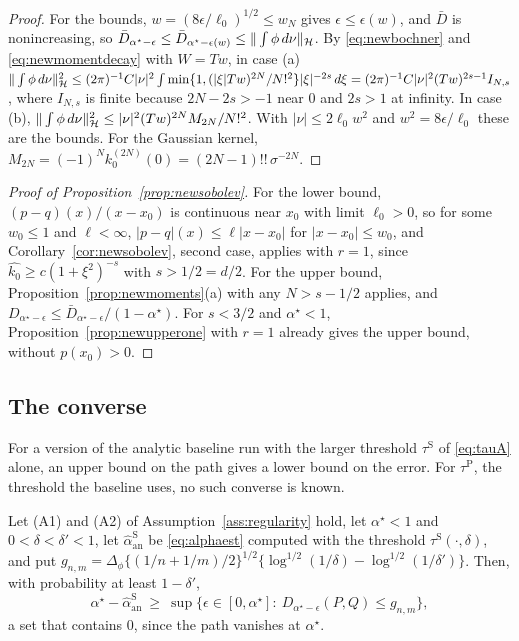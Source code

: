 \begin{proof}
For the bounds, $w=(8\epsilon/\ell_0)^{1/2}\le w_N$ gives $\epsilon\le\epsilon(w)$, and $\bar D$ is nonincreasing, so
$\bar D_{\alpha^\star-\epsilon}\le \bar D_{\alpha^\star-\epsilon(w)}\le\|\int\phi\,d\nu\|_{\mathcal{H}}$. By \eqref{eq:newbochner} and \eqref{eq:newmomentdecay}
with $W=Tw$, in case (a) $\|\int\phi\,d\nu\|_{\mathcal{H}}^2\le(2\pi)^{-1}C|\nu|^2\int\min\{1,(|\xi|Tw)^{2N}/N!^2\}|\xi|^{-2s}\,d\xi
=(2\pi)^{-1}C|\nu|^2(Tw)^{2s-1}I_{N,s}$, where $I_{N,s}$ is finite because $2N-2s>-1$ near $0$ and $2s>1$ at infinity. In case
(b), $\|\int\phi\,d\nu\|_{\mathcal{H}}^2\le|\nu|^2(Tw)^{2N}M_{2N}/N!^2$. With $|\nu|\le2\ell_0w^2$ and $w^2=8\epsilon/\ell_0$ these are the
bounds. For the Gaussian kernel, $M_{2N}=(-1)^Nk_0^{(2N)}(0)=(2N-1)!!\,\sigma^{-2N}$.
\end{proof}

\begin{proof}[Proof of Proposition~\ref{prop:newsobolev}]
For the lower bound, $(p-q)(x)/(x-x_0)$ is continuous near $x_0$ with limit $\ell_0>0$, so for some $w_0\le1$ and $\ell<\infty$,
$|p-q|(x)\le\ell|x-x_0|$ for $|x-x_0|\le w_0$, and Corollary~\ref{cor:newsobolev}, second case, applies with $r=1$, since
$\widehat{k_0}\ge c(1+\xi^2)^{-s}$ with $s>1/2=d/2$. For the upper bound, Proposition~\ref{prop:newmoments}(a) with any
$N>s-1/2$ applies, and $D_{\alpha^\star-\epsilon}\le \bar D_{\alpha^\star-\epsilon}/(1-\alpha^\star)$. For $s<3/2$ and $\alpha^\star<1$,
Proposition~\ref{prop:newupperone} with $r=1$ already gives the upper bound, without $p(x_0)>0$.
\end{proof}

\subsection{The converse}

For a version of the analytic baseline run with the larger threshold $\tau^{\mathrm S}$ of \eqref{eq:tauA} alone, an
upper bound on the path gives a lower bound on the error. For $\tau^{\mathrm P}$, the threshold the baseline uses, no
such converse is known.

\begin{proposition}
\label{prop:newconverse}
Let (A1) and (A2) of Assumption~\ref{ass:regularity} hold, let $\alpha^\star<1$ and $0<\delta<\delta'<1$, let
$\widehat\alpha_{\mathrm{an}}^{\mathrm S}$ be \eqref{eq:alphaest} computed with the threshold $\tau^{\mathrm S}(\cdot,\delta)$, and put
$g_{n,m}=\Delta_\phi\{(1/n+1/m)/2\}^{1/2}\{\log^{1/2}(1/\delta)-\log^{1/2}(1/\delta')\}$. Then, with probability at
least $1-\delta'$,
\[
\alpha^\star-\widehat\alpha_{\mathrm{an}}^{\mathrm S}\ \ge\ \sup\big\{\epsilon\in[0,\alpha^\star]:\ D_{\alpha^\star-\epsilon}(P,Q)\le g_{n,m}\big\} ,
\]
a set that contains $0$, since the path vanishes at $\alpha^\star$.
\end{proposition}

